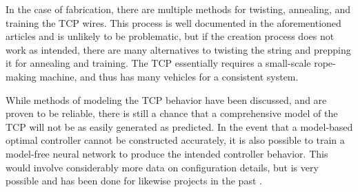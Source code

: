 	In the case of fabrication, there are multiple methods for twisting, annealing, and training the TCP wires. This process is well documented in the aforementioned articles and is unlikely to be problematic, but if the creation process does not work as intended, there are many alternatives to twisting the string and prepping it for annealing and training. The TCP essentially requires a small-scale rope-making machine, and thus has many vehicles for a consistent system.
	
	While methods of modeling the TCP behavior have been discussed, and are proven to be reliable, there is still a chance that a comprehensive model of the TCP will not be as easily generated as predicted. In the event that a model-based optimal controller cannot be constructed accurately, it is also possible to train a model-free neural network to produce the intended controller behavior. This would involve considerably more data on configuration details, but is very possible and has been done for likewise projects in the past \cite{byravan_se3-nets_2017, yang_efficient_2000}.